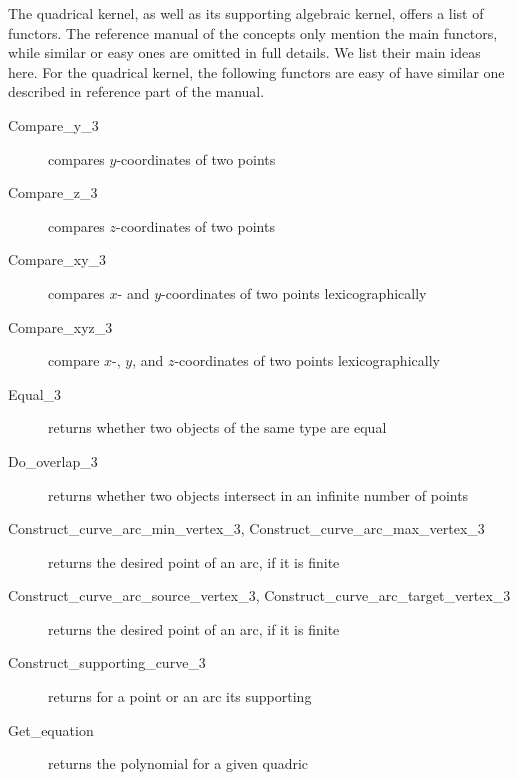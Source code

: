 The quadrical kernel, as well as its supporting algebraic kernel, offers
a list of functors. The reference manual of the concepts only mention
the main functors, while similar or easy ones are omitted in full details.
We list their main ideas here. For the quadrical kernel, the following
functors are easy of have similar one described in reference part
of the manual.
\begin{description}
\item[Compare\_y\_3] compares $y$-coordinates of two points
\item[Compare\_z\_3] compares $z$-coordinates of two points
\item[Compare\_xy\_3] compares $x$- and $y$-coordinates of two points 
lexicographically
\item[Compare\_xyz\_3] compare $x$-, $y$, and $z$-coordinates of two points
lexicographically
\item [Equal\_3] returns whether two objects of the same type are equal
\item [Do\_overlap\_3] returns whether two objects intersect in an infinite 
number of points
\item [Construct\_curve\_arc\_min\_vertex\_3, 
Construct\_curve\_arc\_max\_vertex\_3]
returns the desired point of an arc, if it is finite
\item [Construct\_curve\_arc\_source\_vertex\_3, 
Construct\_curve\_arc\_target\_vertex\_3] 
returns the desired point of an arc, if it is finite
\item [Construct\_supporting\_curve\_3] returns for a point or an arc its
supporting 
\item [Get\_equation] returns the polynomial for a given quadric
\end{description}



